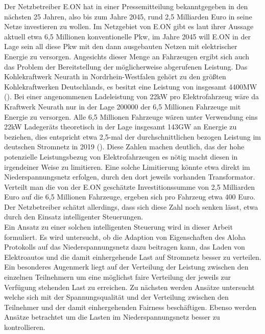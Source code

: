 Der Netzbetreiber E.ON hat in einer Pressemitteilung \cite{eon_presse} bekanntgegeben in den nächsten 25 Jahren, also bis zum Jahre 2045, rund 2,5 Milliarden Euro in seine Netze investieren zu wollen. Im Netzgebiet von E.ON gibt es laut ihrer Aussage aktuell etwa 6,5 Millionen konventionelle Pkw, im Jahre 2045 will E.ON in der Lage sein all diese Pkw mit den dann ausgebauten Netzen mit elektrischer Energie zu versorgen. Angesichts dieser Menge an Fahrzeugen ergibt sich auch das Problem der Bereitstellung der möglicherweise abgerufenen Leistung. Das Kohlekraftwerk Neurath in Nordrhein-Westfalen gehört zu den größten Kohlekraftwerken Deutschlands, es besitzt eine Leistung von insgesamt 4400MW (\cite{power}). Bei einer angenommenen Ladeleistung von 22kW pro Elektrofahrzeug wäre da Kraftwerk Neurath nur in der Lage 200000 der 6,5 Millionen Fahrzeuge mit Energie zu versorgen. Alle 6,5 Millionen Fahrzeuge wären unter Verwendung eins 22kW Ladegeräts theoretisch in der Lage insgesamt 143GW an Energie zu beziehen, dies entspricht etwa 2,5-mal der durchschnittlichen bezogen Leistung im deutschen Stromnetz in 2019 (\cite{fraunhofer}). Diese Zahlen machen deutlich, das der hohe potenzielle Leistungsbezug von Elektrofahrzeugen es nötig macht diesen in irgendeiner Weise zu limitieren. Eine solche Limitierung könnte etwa direkt im Niederspannungsnetz erfolgen, durch den dort jeweils vorhanden Transformator. Verteilt man die von der E.ON geschätzte Investitionssumme von 2,5 Milliarden Euro auf die 6,5 Millionen Fahrzeuge, ergeben sich pro Fahrzeug etwa 400 Euro. Der Netzbetreiber schätzt allerdings, dass sich diese Zahl noch senken lässt, etwa durch den Einsatz intelligenter Steuerungen. \\
Ein Ansatz zu einer solchen intelligenten Steuerung wird in dieser Arbeit formuliert. Es wird untersucht, ob die Adaption von Eigenschaften des Aloha Protokolls auf das Niederspannungsnetz dazu beitragen kann, das Laden von Elektroautos und die damit einhergehende Last auf Stromnetz besser zu verteilen. Ein besonderes Augenmerk liegt auf der Verteilung der Leistung zwischen den einzelnen Teilnehmern um eine möglichst faire Verteilung der jeweils zur Verfügung stehenden Last zu erreichen. Zu nächsten werden Ansätze untersucht welche sich mit der Spannungsqualität und der Verteilung zwischen den Teilnehmer und der damit einhergehenden Fairness beschäftigen. Ebenso werden Ansätze betrachtet um die Lasten im Niederspannungsnetz besser zu kontrollieren.